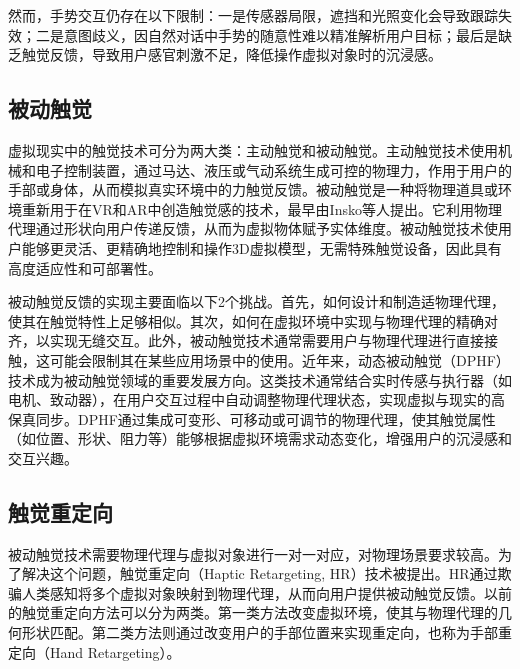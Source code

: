 \documentclass[runningheads]{llncs}
\begin{document}
然而，手势交互仍存在以下限制\cite{herbert2024static,app14114935}：一是传感器局限，遮挡和光照变化会导致跟踪失效；二是意图歧义，因自然对话中手势的随意性难以精准解析用户目标；最后是缺乏触觉反馈，导致用户感官刺激不足，降低操作虚拟对象时的沉浸感。

\subsection{被动触觉}
虚拟现实中的触觉技术可分为两大类：主动触觉和被动触觉。主动触觉技术使用机械和电子控制装置，通过马达、液压或气动系统生成可控的物理力，作用于用户的手部或身体，从而模拟真实环境中的力触觉反馈\cite{vaghela2021active}。被动触觉是一种将物理道具或环境重新用于在VR和AR中创造触觉感的技术，最早由Insko等人提出\cite{insko2001passive}。它利用物理代理通过形状向用户传递反馈，从而为虚拟物体赋予实体维度。被动触觉技术使用户能够更灵活、更精确地控制和操作3D虚拟模型，无需特殊触觉设备，因此具有高度适应性和可部署性\cite{henderson2008opportunistic,shapira2016tactilevr,10.1145/3313831.3376313}。

被动触觉反馈的实现主要面临以下2个挑战。首先，如何设计和制造适物理代理，使其在触觉特性上足够相似。其次，如何在虚拟环境中实现与物理代理的精确对齐，以实现无缝交互\cite{zenner2021combining}。此外，被动触觉技术通常需要用户与物理代理进行直接接触，这可能会限制其在某些应用场景中的使用。近年来，动态被动触觉（DPHF）技术成为被动触觉领域的重要发展方向。这类技术通常结合实时传感与执行器（如电机、致动器），在用户交互过程中自动调整物理代理状态，实现虚拟与现实的高保真同步。DPHF通过集成可变形、可移动或可调节的物理代理，使其触觉属性（如位置、形状、阻力等）能够根据虚拟环境需求动态变化，增强用户的沉浸感和交互兴趣\cite{zenner2017shifty}。


\subsection{触觉重定向}
被动触觉技术需要物理代理与虚拟对象进行一对一对应，对物理场景要求较高。为了解决这个问题，触觉重定向（Haptic Retargeting, HR）技术被提出。HR通过欺骗人类感知将多个虚拟对象映射到物理代理，从而向用户提供被动触觉反馈。以前的触觉重定向方法可以分为两类。第一类方法改变虚拟环境，使其与物理代理的几何形状匹配\cite{zenner2017shifty,10.1145/2858036.2858226}。第二类方法则通过改变用户的手部位置来实现重定向\cite{zenner2019estimating,hartfill2021analysis}，也称为手部重定向（Hand Retargeting）\cite{zenner2021hart}。
\end{document}
